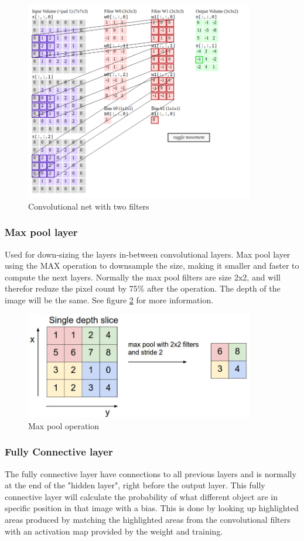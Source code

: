 \begin{figure}%
    \centering
        \includegraphics[width=10cm]{img/convNet.png} 
    \caption{Convolutional net with two filters \cite{SF_ConvNet} }
    \label{fig:SF_convNet}
\end{figure}

\subsubsection{Max pool layer}
Used for down-sizing the layers in-between convolutional layers. Max pool layer using the MAX operation to downsample the size, making it smaller and faster to compute the next layers. Normally the max pool filters are size 2x2, and will therefor reduze the pixel count by 75\% after the operation. The depth of the image will be the same. See figure \ref{fig:maxpool} for more information. \cite{SF_ConvNet}
\begin{figure}%
    \centering
        \includegraphics[width=10cm]{img/maxpool.jpeg}
    \caption{Max pool operation \cite{SF_ConvNet} }
    \label{fig:maxpool}
\end{figure}

\subsubsection{Fully Connective layer}
The fully connective layer have connections to all previous layers and is normally at the end of the "hidden layer", right before the output layer. This fully connective layer will calculate the probability of what different object are in specific position in that image with a bias. This is done by looking up highlighted areas produced by matching the highlighted areas from the convolutional filters with an activation map provided by the weight and training. \cite{FCC}

